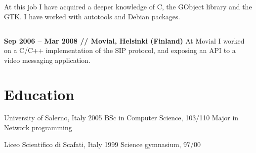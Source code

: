 \documentclass[10pt]{tccv}
\begin{document}
				At this job I have acquired a deeper knowledge of C, the
				GObject library and the GTK. I have worked with autotools and
				Debian packages.

			\subsection{}
				\textbf{Sep 2006 -- Mar 2008 // Movial, Helsinki (Finland)} At
				Movial I worked on a C/C++ implementation of the SIP protocol,
				and exposing an API to a video messaging application.


		\section{Education}
			\begin{yearlist}
				\item[University of Salerno, Italy]{2005}
					{BSc in Computer Science, 103/110}
					{Major in Network programming}

				\item[Liceo Scientifico di Scafati, Italy]{1999}
					{Science gymnasium, 97/00}
					{}
			\end{yearlist}
\end{document}
